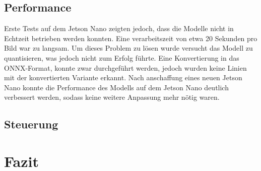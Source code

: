 \documentclass{article}
\begin{document}
        \subsection{Performance}

            
            Erste Tests auf dem Jetson Nano zeigten jedoch, dass die Modelle nicht in Echtzeit betrieben werden konnten. Eine verarbeitszeit von etwa 20 Sekunden pro Bild war zu langsam.
            Um dieses Problem zu lösen wurde versucht das Modell zu quantisieren, was jedoch nicht zum Erfolg führte.
            Eine Konvertierung in das ONNX-Format, konnte zwar durchgeführt werden, jedoch wurden keine Linien mit der konvertierten Variante erkannt.
            Nach anschaffung eines neuen Jetson Nano konnte die Performance des Modells auf dem Jetson Nano deutlich verbessert werden, sodass keine weitere Anpassung mehr nötig waren.
        \subsection{Steuerung}
    \section{Fazit}
\end{document}
